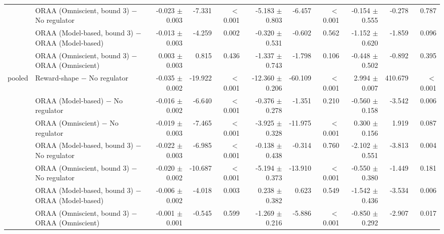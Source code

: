 \begin{tabular}{llrrrrrrrrr}
 & ORAA (Omniscient, bound 3) $-$ No regulator & -0.023 $\pm$ 0.003 & -7.331 & $<$0.001 & -5.183 $\pm$ 0.803 & -6.457 & $<$0.001 & -0.154 $\pm$ 0.555 & -0.278 & 0.787 \\
 & ORAA (Model-based, bound 3) $-$ ORAA (Model-based) & -0.013 $\pm$ 0.003 & -4.259 & 0.002 & -0.320 $\pm$ 0.531 & -0.602 & 0.562 & -1.152 $\pm$ 0.620 & -1.859 & 0.096 \\
 & ORAA (Omniscient, bound 3) $-$ ORAA (Omniscient) & 0.003 $\pm$ 0.003 & 0.815 & 0.436 & -1.337 $\pm$ 0.743 & -1.798 & 0.106 & -0.448 $\pm$ 0.502 & -0.892 & 0.395 \\
\addlinespace
pooled & Reward-shape $-$ No regulator & -0.035 $\pm$ 0.002 & -19.922 & $<$0.001 & -12.360 $\pm$ 0.206 & -60.109 & $<$0.001 & 2.994 $\pm$ 0.007 & 410.679 & $<$0.001 \\
 & ORAA (Model-based) $-$ No regulator & -0.016 $\pm$ 0.002 & -6.640 & $<$0.001 & -0.376 $\pm$ 0.278 & -1.351 & 0.210 & -0.560 $\pm$ 0.158 & -3.542 & 0.006 \\
 & ORAA (Omniscient) $-$ No regulator & -0.019 $\pm$ 0.003 & -7.465 & $<$0.001 & -3.925 $\pm$ 0.328 & -11.975 & $<$0.001 & 0.300 $\pm$ 0.156 & 1.919 & 0.087 \\
 & ORAA (Model-based, bound 3) $-$ No regulator & -0.022 $\pm$ 0.003 & -6.985 & $<$0.001 & -0.138 $\pm$ 0.438 & -0.314 & 0.760 & -2.102 $\pm$ 0.551 & -3.813 & 0.004 \\
 & ORAA (Omniscient, bound 3) $-$ No regulator & -0.020 $\pm$ 0.002 & -10.687 & $<$0.001 & -5.194 $\pm$ 0.373 & -13.910 & $<$0.001 & -0.550 $\pm$ 0.380 & -1.449 & 0.181 \\
 & ORAA (Model-based, bound 3) $-$ ORAA (Model-based) & -0.006 $\pm$ 0.002 & -4.018 & 0.003 & 0.238 $\pm$ 0.382 & 0.623 & 0.549 & -1.542 $\pm$ 0.436 & -3.534 & 0.006 \\
 & ORAA (Omniscient, bound 3) $-$ ORAA (Omniscient) & -0.001 $\pm$ 0.001 & -0.545 & 0.599 & -1.269 $\pm$ 0.216 & -5.886 & $<$0.001 & -0.850 $\pm$ 0.292 & -2.907 & 0.017 \\
\bottomrule
\end{tabular}
